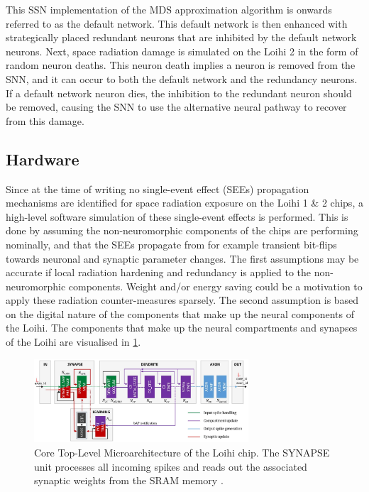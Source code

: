 This SSN implementation of the MDS approximation algorithm is onwards referred to as the default network. This default network is then enhanced with strategically placed redundant neurons that are inhibited by the default network neurons. Next, space radiation damage is simulated on the Loihi 2 in the form of random neuron deaths. This neuron death implies a neuron is removed from the SNN, and it can occur to both the default network and the redundancy neurons. If a default network neuron dies, the inhibition to the redundant neuron should be removed, causing the SNN to use the alternative neural pathway to recover from this damage.

\subsection{Hardware}\label{subsec:hardware}
Since at the time of writing no single-event effect (SEEs) propagation mechanisms are identified for space radiation exposure on the Loihi 1 \& 2 chips, a high-level software simulation of these single-event effects is performed. This is done by assuming the non-neuromorphic components of the chips are performing nominally, and that the SEEs propagate from for example transient bit-flips towards neuronal and synaptic parameter changes. The first assumptions may be accurate if local radiation hardening and redundancy is applied to the non-neuromorphic components. Weight and/or energy saving could be a motivation to apply these radiation counter-measures sparsely. The second assumption is based on the digital nature of the components that make up the neural components of the Loihi. The components that make up the neural compartments and synapses of the Loihi are visualised in \cref{fig:loihi_micro_architecture}.
\begin{figure}[H]
    \centering
    \includegraphics[width=8cm]{latex/Images/loihi_micro_architecture.png}
    \caption{Core Top-Level Microarchitecture of the Loihi chip. The SYNAPSE unit processes all incoming spikes and
    reads out the associated synaptic weights from the SRAM memory \cite{}%
    .}
    \label{fig:loihi_micro_architecture}
\end{figure}



